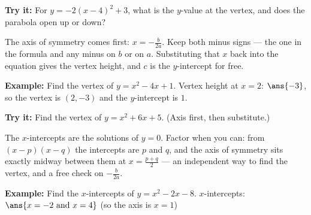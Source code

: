 \documentclass[12pt]{article}
\begin{document}
\begin{tryitbox}
\textbf{Try it:} For $y = -2(x-4)^2 + 3$, what is the $y$-value at the vertex,
and does the parabola open up or down?\\[2pt]
\end{tryitbox}


\begin{formulabox}
The axis of symmetry comes first: $x = -\frac{b}{2a}$. Keep both minus signs
--- the one in the formula and any minus on $b$ or on $a$. Substituting that
$x$ back into the equation gives the vertex height, and $c$ is the
$y$-intercept for free.
\end{formulabox}

\begin{examplebox}
\textbf{Example:} Find the vertex of $y = x^2 - 4x + 1$.
Vertex height at $x = 2$: $\ans{-3}$, so the vertex is $(2,-3)$ and the
$y$-intercept is $1$.
\end{examplebox}

\begin{tryitbox}
\textbf{Try it:} Find the vertex of $y = x^2 + 6x + 5$. (Axis first, then
substitute.)\\[2pt]
\end{tryitbox}


\begin{formulabox}
The $x$-intercepts are the solutions of $y = 0$. Factor when you can: from
$(x-p)(x-q)$ the intercepts are $p$ and $q$, and the axis of symmetry sits
exactly midway between them at $x = \frac{p+q}{2}$ --- an independent way to
find the vertex, and a free check on $-\frac{b}{2a}$.
\end{formulabox}

\begin{examplebox}
\textbf{Example:} Find the $x$-intercepts of $y = x^2 - 2x - 8$.
$x$-intercepts: $\ans{x = -2 \text{ and } x = 4}$ (so the axis is $x = 1$)
\end{examplebox}
\end{document}
